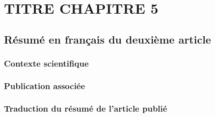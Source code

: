 \chapter{TITRE CHAPITRE 5}
\label{chap5}

\section{Résumé en français du deuxième article}

\subsection{Contexte scientifique}

\subsection{Publication associée}

\subsection{Traduction du résumé de l'article publié}
